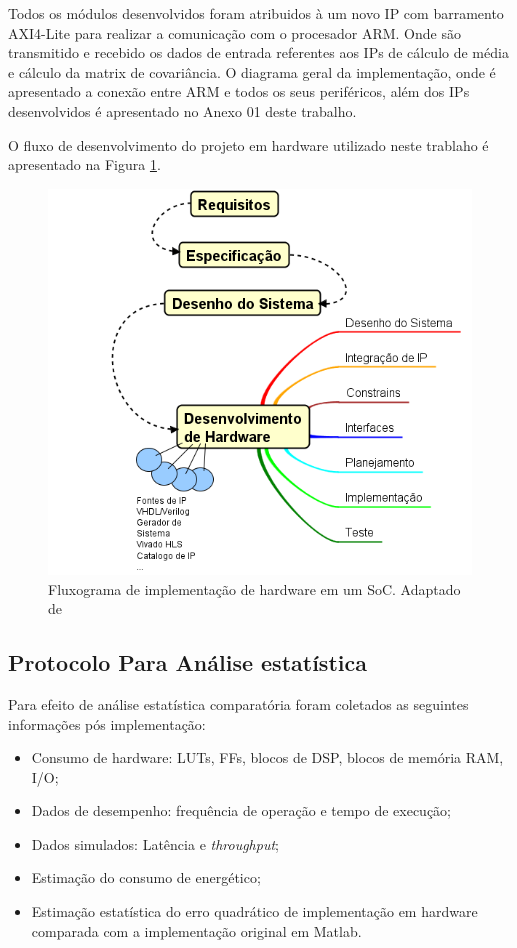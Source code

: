 Todos os módulos desenvolvidos foram atribuidos à um novo IP com barramento AXI4-Lite para realizar a comunicação com o procesador ARM. Onde são transmitido e recebido os dados de entrada referentes aos IPs de cálculo de média e cálculo da matrix de covariância. O diagrama geral da implementação, onde é apresentado a conexão entre ARM e todos os seus periféricos, além dos IPs desenvolvidos é apresentado no Anexo 01 deste trabalho.

O fluxo de desenvolvimento do projeto em hardware utilizado neste trablaho é apresentado na Figura \ref{diagram_hardware}.

\begin{figure}[h]
  \centering
  \includegraphics[keepaspectratio=true,scale=1.0]{figuras/fluxograma_hardware.PNG}
  \caption{Fluxograma de implementação de hardware em um SoC. Adaptado de \cite{zynqBook}}
  \label{diagram_hardware}
\end{figure}

\subsection{Protocolo Para Análise estatística}
Para efeito de análise estatística comparatória foram coletados as seguintes informações pós implementação:

\begin{itemize}[noitemsep]
	\item Consumo de hardware: LUTs, FFs, blocos de DSP, blocos de memória RAM, I/O;
	\item Dados de desempenho: frequência de operação e tempo de execução;
	\item Dados simulados: Latência e \textit{throughput};
	\item Estimação do consumo de energético;
	\item Estimação estatística do erro quadrático de implementação em hardware comparada com a implementação original em Matlab.
\end{itemize}


